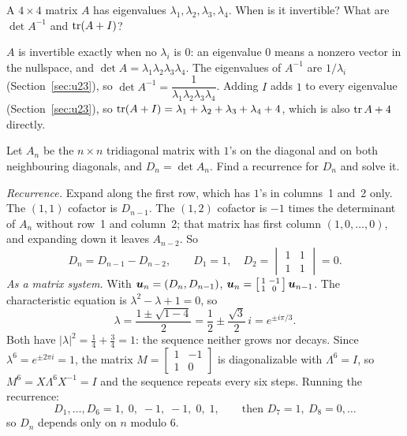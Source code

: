 \begin{example}\label{ex:u27-eigfacts}
A $4\times4$ matrix $A$ has eigenvalues $\lambda_1,\lambda_2,\lambda_3,\lambda_4$. When is it
invertible? What are $\det A^{-1}$ and $\operatorname{tr}(A+I)$?

$A$ is invertible exactly when no $\lambda_i$ is $0$: an eigenvalue $0$ means a nonzero vector
in the nullspace, and $\det A=\lambda_1\lambda_2\lambda_3\lambda_4$. The eigenvalues of
$A^{-1}$ are $1/\lambda_i$ (Section~\ref{sec:u23}), so
$\det A^{-1}=\dfrac{1}{\lambda_1\lambda_2\lambda_3\lambda_4}$. Adding $I$ adds $1$ to every
eigenvalue (Section~\ref{sec:u23}), so
$\operatorname{tr}(A+I)=\lambda_1+\lambda_2+\lambda_3+\lambda_4+4$, which is also $\operatorname{tr} A+4$ directly.
\end{example}

\begin{example}\label{ex:u27-tridiag}
Let $A_n$ be the $n\times n$ tridiagonal matrix with $1$'s on the diagonal and on both
neighbouring diagonals, and $D_n=\det A_n$. Find a recurrence for $D_n$ and solve it.

\emph{Recurrence.} Expand along the first row, which has $1$'s in columns~1 and~2 only. The
$(1,1)$ cofactor is $D_{n-1}$. The $(1,2)$ cofactor is $-1$ times the determinant of $A_n$
without row~1 and column~2; that matrix has first column $(1,0,\dots,0)$, and expanding
down it leaves $A_{n-2}$. So
\[
  D_n=D_{n-1}-D_{n-2},\qquad D_1=1,\quad D_2=\begin{vmatrix} 1&1\\ 1&1\end{vmatrix}=0 .
\]
\emph{As a matrix system.} With $\boldsymbol{u}_n=(D_n,D_{n-1})$,
$\boldsymbol{u}_n=\left[\begin{smallmatrix} 1&-1\\ 1&0\end{smallmatrix}\right]\boldsymbol{u}_{n-1}$. The
characteristic equation is $\lambda^{2}-\lambda+1=0$, so
\[
  \lambda=\frac{1\pm\sqrt{1-4}}{2}=\frac12\pm\frac{\sqrt3}{2}\,i=e^{\pm i\pi/3}.
\]
Both have $|\lambda|^{2}=\tfrac14+\tfrac34=1$: the sequence neither grows nor decays. Since
$\lambda^{6}=e^{\pm2\pi i}=1$, the matrix $M=\left[\begin{smallmatrix} 1&-1\\ 1&0\end{smallmatrix}\right]$
is diagonalizable with $\Lambda^{6}=I$, so $M^{6}=X\Lambda^{6}X^{-1}=I$ and the sequence
repeats every six steps. Running the recurrence:
\[
  D_1,\dots,D_6=1,\;0,\;-1,\;-1,\;0,\;1,\qquad\text{then } D_7=1,\ D_8=0,\dots
\]
so $D_n$ depends only on $n$ modulo $6$.
\end{example}


